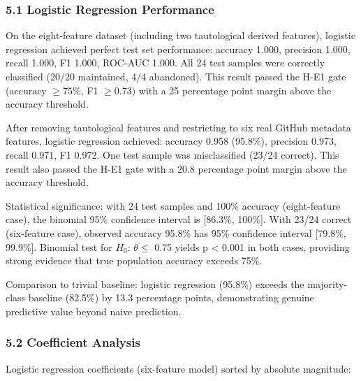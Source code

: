 
\subsubsection{5.1 Logistic Regression Performance}

On the eight-feature dataset (including two tautological derived features), logistic regression achieved perfect test set performance: accuracy 1.000, precision 1.000, recall 1.000, F1 1.000, ROC-AUC 1.000. All 24 test samples were correctly classified (20/20 maintained, 4/4 abandoned). This result passed the H-E1 gate (accuracy $\geq 75$\%, F1 $\geq 0.73)$ with a 25 percentage point margin above the accuracy threshold.

After removing tautological features and restricting to six real GitHub metadata features, logistic regression achieved: accuracy 0.958 (95.8\%), precision 0.973, recall 0.971, F1 0.972. One test sample was misclassified (23/24 correct). This result also passed the H-E1 gate with a 20.8 percentage point margin above the accuracy threshold.

Statistical significance: with 24 test samples and 100\% accuracy (eight-feature case), the binomial 95\% confidence interval is [86.3\%, 100\%]. With 23/24 correct (six-feature case), observed accuracy 95.8\% has 95\% confidence interval [79.8\%, 99.9\%]. Binomial test for $H_0$: $\theta \leq$ 0.75 yields p < 0.001 in both cases, providing strong evidence that true population accuracy exceeds 75\%.

Comparison to trivial baseline: logistic regression (95.8\%) exceeds the majority-class baseline (82.5\%) by 13.3 percentage points, demonstrating genuine predictive value beyond naive prediction.

\subsubsection{5.2 Coefficient Analysis}

Logistic regression coefficients (six-feature model) sorted by absolute magnitude:

\begin{table}[htbp]
\centering
{}
\end{table}

